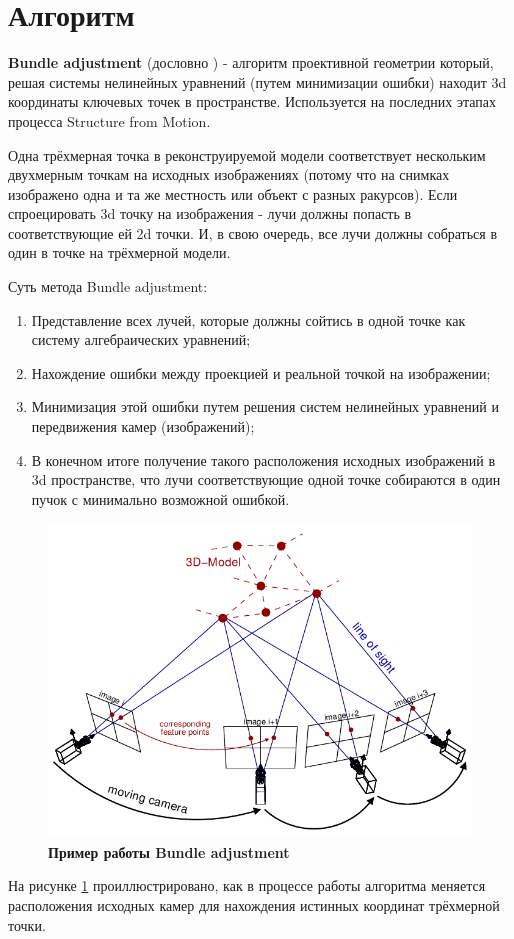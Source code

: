 \section{Алгоритм }

\textbf{Bundle adjustment} (дословно ) - алгоритм проективной геометрии который, решая системы нелинейных уравнений (путем минимизации ошибки) находит 3d координаты ключевых точек в пространстве. Используется на последних этапах процесса Structure from Motion.

Одна трёхмерная точка в реконструируемой модели соответствует нескольким двухмерным точкам на исходных изображениях (потому что на снимках изображено одна и та же местность или объект с разных ракурсов). Если спроецировать 3d точку на изображения - лучи должны попасть в соответствующие ей 2d точки. И, в свою очередь, все лучи должны собраться в один  в точке на трёхмерной модели.

Суть метода Bundle adjustment:
\begin{enumerate}
    \item Представление всех лучей, которые должны сойтись в одной точке как систему алгебраических уравнений;
    \item Нахождение ошибки между проекцией и реальной точкой на изображении;
    \item Минимизация этой ошибки путем решения систем нелинейных уравнений и передвижения камер (изображений);
    \item В конечном итоге получение такого расположения исходных изображений в 3d пространстве, что лучи соответствующие одной точке собираются в один пучок с минимально возможной ошибкой.
\end{enumerate}

\begin{figure}[h]
    \centering
    \includegraphics[width=1\textwidth]{images/bundle_adjustment.png}
    \caption{\textbf{Пример работы Bundle adjustment}}
    \label{fig:ba}
\end{figure}

На рисунке \ref{fig:ba} проиллюстрировано, как в процессе работы алгоритма меняется расположения исходных камер для нахождения истинных координат трёхмерной точки.

